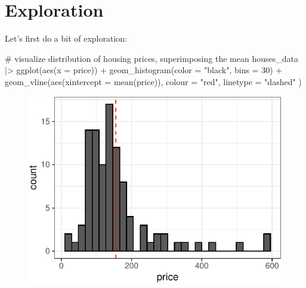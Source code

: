 \documentclass[
  11pt,
  letterpaper,
  oneside]{book}
\newenvironment{Shaded}{\begin{snugshade}}{\end{snugshade}}
\newcommand{\AttributeTok}[1]{\textcolor[rgb]{0.40,0.45,0.13}{#1}}
\newcommand{\CommentTok}[1]{\textcolor[rgb]{0.37,0.37,0.37}{#1}}
\newcommand{\DecValTok}[1]{\textcolor[rgb]{0.68,0.00,0.00}{#1}}
\newcommand{\FunctionTok}[1]{\textcolor[rgb]{0.28,0.35,0.67}{#1}}
\newcommand{\NormalTok}[1]{\textcolor[rgb]{0.00,0.23,0.31}{#1}}
\newcommand{\SpecialCharTok}[1]{\textcolor[rgb]{0.37,0.37,0.37}{#1}}
\newcommand{\StringTok}[1]{\textcolor[rgb]{0.13,0.47,0.30}{#1}}
\theoremstyle{definition}
\theoremstyle{plain}
\theoremstyle{plain}
\theoremstyle{plain}
\theoremstyle{remark}
\begin{document}
\hypertarget{exploration-1}{%
\section{Exploration}\label{exploration-1}}

Let's first do a bit of exploration:

\begin{Shaded}
\begin{Highlighting}[]
\CommentTok{\# visualize distribution of housing prices, superimposing the mean}
\NormalTok{houses\_data }\SpecialCharTok{|\textgreater{}}
  \FunctionTok{ggplot}\NormalTok{(}\FunctionTok{aes}\NormalTok{(}\AttributeTok{x =}\NormalTok{ price)) }\SpecialCharTok{+}
  \FunctionTok{geom\_histogram}\NormalTok{(}\AttributeTok{color =} \StringTok{"black"}\NormalTok{, }\AttributeTok{bins =} \DecValTok{30}\NormalTok{) }\SpecialCharTok{+}
  \FunctionTok{geom\_vline}\NormalTok{(}\FunctionTok{aes}\NormalTok{(}\AttributeTok{xintercept =} \FunctionTok{mean}\NormalTok{(price)),}
    \AttributeTok{colour =} \StringTok{"red"}\NormalTok{,}
    \AttributeTok{linetype =} \StringTok{"dashed"}
\NormalTok{  )}
\end{Highlighting}
\end{Shaded}

\begin{figure}[H]

{\centering \includegraphics{r-demo-part-2_files/figure-pdf/unnamed-chunk-3-1.pdf}

}

\end{figure}
\end{document}
